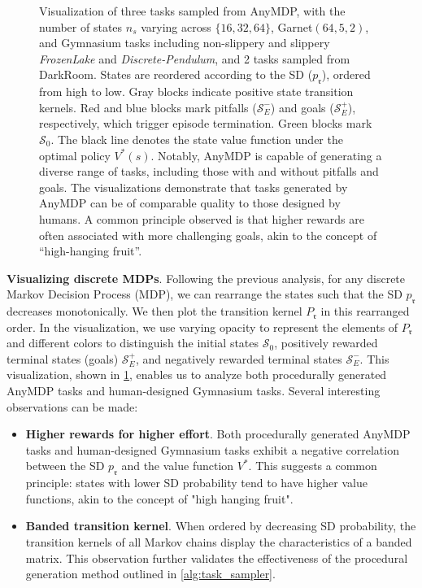 \documentclass{article}
\begin{document}
\begin{figure}[!htbp]
\caption{Visualization of three tasks sampled from AnyMDP, with the number of states $n_s$ varying across $\{16, 32, 64\}$, Garnet$(64,5,2)$, and Gymnasium tasks including non-slippery and slippery \emph{FrozenLake} and \emph{Discrete-Pendulum}, and 2 tasks sampled from DarkRoom. States are reordered according to the SD ($p_{\mathfrak{r}}$), ordered from high to low. Gray blocks indicate positive state transition kernels. Red and blue blocks mark pitfalls ($\mathcal{S}^-_E$) and goals ($\mathcal{S}^+_E$), respectively, which trigger episode termination. Green blocks mark $\mathcal{S}_0$. The black line denotes the state value function under the optimal policy $V^*(s)$. Notably, AnyMDP is capable of generating a diverse range of tasks, including those with and without pitfalls and goals. The visualizations demonstrate that tasks generated by AnyMDP can be of comparable quality to those designed by humans. A common principle observed is that higher rewards are often associated with more challenging goals, akin to the concept of ``high-hanging fruit''.}
\label{fig:anymdp_visualization}
\end{figure}
\textbf{Visualizing discrete MDPs}. Following the previous analysis, for any discrete Markov Decision Process (MDP), we can rearrange the states such that the SD $p_{\mathfrak{r}}$ decreases monotonically. We then plot the transition kernel $P_{\mathfrak{r}}$ in this rearranged order. In the visualization, we use varying opacity to represent the elements of $P_{\mathfrak{r}}$ and different colors to distinguish the initial states $\mathcal{S}_0$, positively rewarded terminal states (goals) $\mathcal{S}^+_E$, and negatively rewarded terminal states $\mathcal{S}^-_E$. This visualization, shown in \cref{fig:anymdp_visualization}, enables us to analyze both procedurally generated AnyMDP tasks and human-designed Gymnasium tasks. Several interesting observations can be made:
\begin{itemize}
    \item \textbf{Higher rewards for higher effort}. Both procedurally generated AnyMDP tasks and human-designed Gymnasium tasks exhibit a negative correlation between the SD $p_{\mathfrak{r}}$ and the value function $V^{*}$. This suggests a common principle: states with lower SD probability tend to have higher value functions, akin to the concept of "high hanging fruit".
    \item \textbf{Banded transition kernel}. When ordered by decreasing SD probability, the transition kernels of all Markov chains display the characteristics of a banded matrix. This observation further validates the effectiveness of the procedural generation method outlined in \cref{alg:task_sampler}.
\end{itemize}
\end{document}
